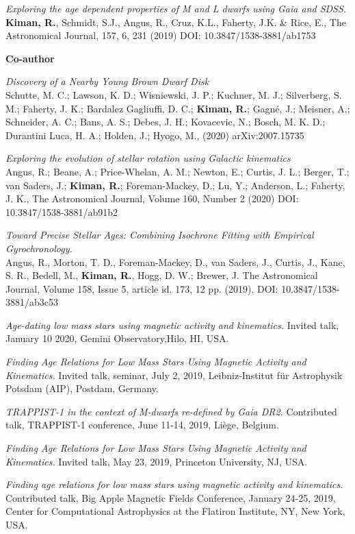 \documentclass[10pt]{cv}
\begin{document}
\begin{llist}
\textit{Exploring the age dependent properties of M and L dwarfs using \textit{Gaia} and SDSS.}\\
\textbf{Kiman, R.}, Schmidt, S.J., Angus, R., Cruz, K.L., Faherty, J.K. \& Rice, E., The Astronomical Journal, 157, 6, 231 (2019) DOI: 10.3847/1538-3881/ab1753 


\textbf{Co-author}

\textit{Discovery of a Nearby Young Brown Dwarf Disk}\\
Schutte, M. C.; Lawson, K. D.; Wisniewski, J. P.; Kuchner, M. J.; Silverberg, S. M.; Faherty, J. K.; Bardalez Gagliuffi, D. C.; \textbf{Kiman, R.}; Gagné, J.; Meisner, A.; Schneider, A. C.; Bans, A. S.; Debes, J. H.; Kovacevic, N.; Bosch, M. K. D.; Durantini Luca, H. A.; Holden, J.; Hyogo, M., (2020) arXiv:2007.15735

\textit{Exploring the evolution of stellar rotation using Galactic kinematics}\\
Angus, R.; Beane, A.; Price-Whelan, A. M.; Newton, E.; Curtis, J. L.; Berger, T.; van Saders, J.; \textbf{Kiman, R.}; Foreman-Mackey, D.; Lu, Y.; Anderson, L.; Faherty, J. K., The Astronomical Journal, Volume 160, Number 2 (2020) DOI: 10.3847/1538-3881/ab91b2

\textit{Toward Precise Stellar Ages: Combining Isochrone Fitting with Empirical Gyrochronology.}\\ 
Angus, R., Morton, T. D., Foreman-Mackey, D., van Saders, J., Curtis, J., Kane, S. R., Bedell, M., \textbf{Kiman, R.}, Hogg, D. W.; Brewer, J. The Astronomical Journal, Volume 158, Issue 5, article id. 173, 12 pp. (2019). DOI: 10.3847/1538-3881/ab3c53


\textit{Age-dating low mass stars using magnetic activity and kinematics.} Invited talk, January 10 2020, Gemini Observatory,Hilo, HI, USA.

\textit{Finding Age Relations for Low Mass Stars Using Magnetic Activity and Kinematics.} Invited talk, seminar, July 2, 2019, Leibniz-Institut für Astrophysik Potsdam (AIP), Postdam, Germany.

\textit{TRAPPIST-1 in the context of M-dwarfs re-defined by Gaia DR2.} Contributed talk, TRAPPIST-1 conference, June 11-14, 2019, Li\`ege, Belgium.

\textit{Finding Age Relations for Low Mass Stars Using Magnetic Activity and Kinematics.} Invited talk, May 23, 2019, Princeton University, NJ, USA. 

\textit{Finding age relations for low mass stars using magnetic activity and kinematics.} Contributed talk, Big Apple Magnetic Fields Conference, January 24-25, 2019, Center for Computational Astrophysics at the Flatiron Institute, NY, New York, USA. 


\end{llist}
\end{document}
